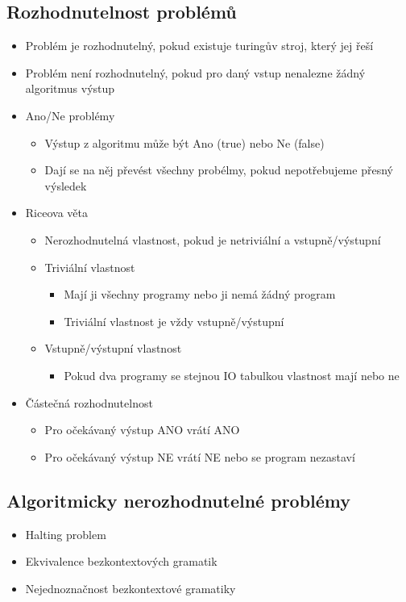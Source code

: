 \documentclass[openany]{book}
\begin{document}
\subsection{Rozhodnutelnost problémů}
\begin{itemize}
    \item Problém je rozhodnutelný, pokud existuje turingův stroj, který jej řeší
    \item Problém není rozhodnutelný, pokud pro daný vstup nenalezne žádný algoritmus výstup
    \item Ano/Ne problémy
    \begin{itemize}
        \item Výstup z algoritmu může být Ano (true) nebo Ne (false)
        \item Dají se na něj převést všechny probélmy, pokud nepotřebujeme přesný výsledek
    \end{itemize}
    \item Riceova věta
    \begin{itemize}
        \item Nerozhodnutelná vlastnost, pokud je netriviální a vstupně/výstupní
        \item Triviální vlastnost
        \begin{itemize}
            \item Mají ji všechny programy nebo ji nemá žádný program 
            \item Triviální vlastnost je vždy vstupně/výstupní
        \end{itemize}
        \item Vstupně/výstupní vlastnost
        \begin{itemize}
            \item Pokud dva programy se stejnou IO tabulkou vlastnost mají nebo ne 
        \end{itemize}
    \end{itemize}
    \item Částečná rozhodnutelnost
    \begin{itemize}
        \item Pro očekávaný výstup ANO vrátí ANO
        \item Pro očekávaný výstup NE vrátí NE nebo se program nezastaví
    \end{itemize}
\end{itemize}

\subsection{Algoritmicky nerozhodnutelné problémy}
\begin{itemize}
    \item Halting problem
    \item Ekvivalence bezkontextových gramatik
    \item Nejednoznačnost bezkontextové gramatiky
\end{itemize}
\end{document}
